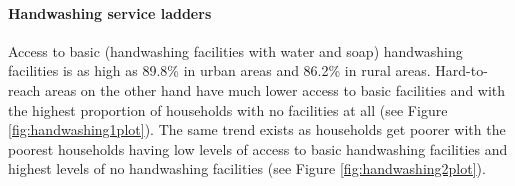 \documentclass[12pt,a4paper]{article}
\let\oldparagraph\paragraph
\renewcommand{\paragraph}[1]{\oldparagraph{#1}\mbox{}}
\begin{document}
\hypertarget{handwashing-service-ladders}{%
\paragraph{Handwashing service ladders}\label{handwashing-service-ladders}}

Access to basic (handwashing facilities with water and soap) handwashing facilities is as high as 89.8\% in urban areas and 86.2\% in rural areas. Hard-to-reach areas on the other hand have much lower access to basic facilities and with the highest proportion of households with no facilities at all (see Figure \ref{fig:handwashing1plot}). The same trend exists as households get poorer with the poorest households having low levels of access to basic handwashing facilities and highest levels of no handwashing facilities (see Figure \ref{fig:handwashing2plot}).
\end{document}
